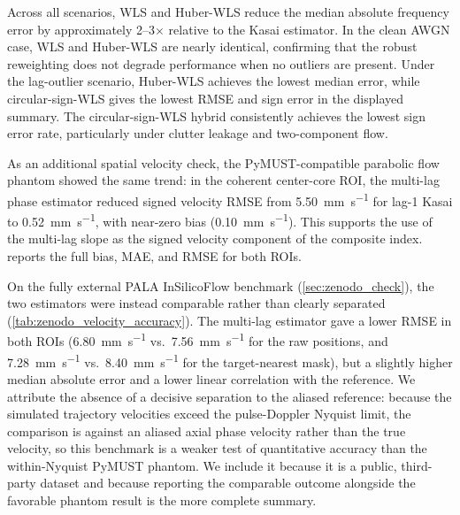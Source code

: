 \documentclass[11pt]{article}
\begin{document}


Across all scenarios, WLS and Huber-WLS reduce the median absolute
frequency error by approximately 2--3$\times$ relative to the Kasai
estimator.  In the clean AWGN case, WLS and Huber-WLS are nearly
identical, confirming that the robust reweighting does not degrade
performance when no outliers are present.  Under the lag-outlier
scenario, Huber-WLS achieves the lowest median error, while
circular-sign-WLS gives the lowest RMSE and sign error in the displayed
summary.  The circular-sign-WLS hybrid consistently achieves the
lowest sign error rate, particularly under clutter leakage and
two-component flow.

As an additional spatial velocity check, the PyMUST-compatible parabolic
flow phantom showed the same trend: in the coherent center-core ROI,
the multi-lag phase estimator reduced signed velocity RMSE from
\SI{5.50}{\milli\meter\per\second} for lag-1 Kasai to
\SI{0.52}{\milli\meter\per\second}, with near-zero bias
(\SI{0.10}{\milli\meter\per\second}).  This supports the use of the
multi-lag slope as the signed velocity component of the composite
index.   reports the full bias, MAE,
and RMSE for both ROIs.

On the fully external PALA InSilicoFlow benchmark
(\cref{sec:zenodo_check}), the two estimators were instead comparable
rather than clearly separated (\cref{tab:zenodo_velocity_accuracy}).
The multi-lag estimator gave a lower RMSE in both ROIs
(\SI{6.80}{\milli\meter\per\second} vs.\
\SI{7.56}{\milli\meter\per\second} for the raw positions, and
\SI{7.28}{\milli\meter\per\second} vs.\
\SI{8.40}{\milli\meter\per\second} for the target-nearest mask), but a
slightly higher median absolute error and a lower linear correlation
with the reference.  We attribute the absence of a decisive separation
to the aliased reference: because the simulated trajectory velocities
exceed the pulse-Doppler Nyquist limit, the comparison is against an
aliased axial phase velocity rather than the true velocity, so this
benchmark is a weaker test of quantitative accuracy than the
within-Nyquist PyMUST phantom.  We include it because it is a public,
third-party dataset and because reporting the comparable outcome
alongside the favorable phantom result is the more complete summary.



\end{document}
